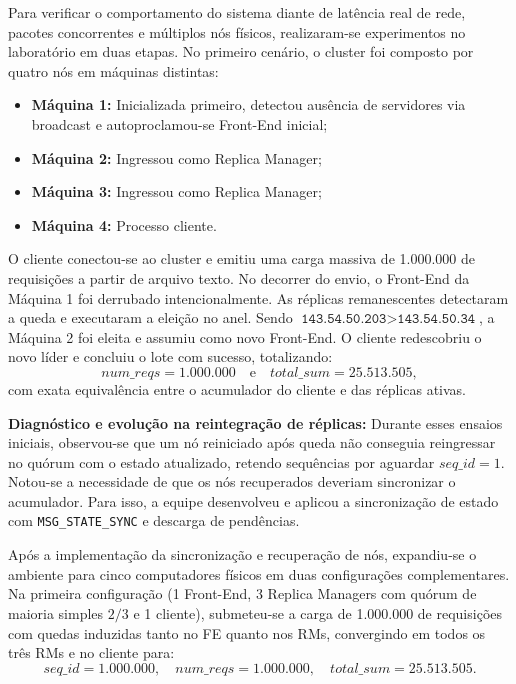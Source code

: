 \documentclass[12pt,a4paper]{article}
\newcommand{\mensagem}[1]{\texttt{#1}}
\begin{document}
Para verificar o comportamento do sistema diante de latência real de rede, pacotes concorrentes e múltiplos nós físicos, realizaram-se experimentos no laboratório em duas etapas. No primeiro cenário, o cluster foi composto por quatro nós em máquinas distintas:
\begin{itemize}
    \item \textbf{Máquina 1:} Inicializada primeiro, detectou ausência de servidores via broadcast e autoproclamou-se Front-End inicial;
    \item \textbf{Máquina 2:} Ingressou como Replica Manager;
    \item \textbf{Máquina 3:} Ingressou como Replica Manager;
    \item \textbf{Máquina 4:} Processo cliente.
\end{itemize}

O cliente conectou-se ao cluster e emitiu uma carga massiva de 1.000.000 de requisições a partir de arquivo texto. No decorrer do envio, o Front-End da Máquina 1 foi derrubado intencionalmente. As réplicas remanescentes detectaram a queda e executaram a eleição no anel. Sendo $\texttt{143.54.50.203} > \texttt{143.54.50.34}$, a Máquina 2 foi eleita e assumiu como novo Front-End. O cliente redescobriu o novo líder e concluiu o lote com sucesso, totalizando:
\[
    num\_reqs = 1.000.000 \quad \text{e} \quad total\_sum = 25.513.505,
\]
com exata equivalência entre o acumulador do cliente e das réplicas ativas.

\noindent\textbf{Diagnóstico e evolução na reintegração de réplicas:} Durante esses ensaios iniciais, observou-se que um nó reiniciado após queda não conseguia reingressar no quórum com o estado atualizado, retendo sequências por aguardar $seq\_id=1$. Notou-se a necessidade de que os nós recuperados deveriam sincronizar o acumulador. Para isso, a equipe desenvolveu e aplicou a sincronização de estado com \mensagem{MSG\_STATE\_SYNC} e descarga de pendências.

Após a implementação da sincronização e recuperação de nós, expandiu-se o ambiente para cinco computadores físicos em duas configurações complementares. Na primeira configuração (1 Front-End, 3 Replica Managers com quórum de maioria simples $2/3$ e 1 cliente), submeteu-se a carga de 1.000.000 de requisições com quedas induzidas tanto no FE quanto nos RMs, convergindo em todos os três RMs e no cliente para:
\[
    seq\_id = 1.000.000, \quad num\_reqs = 1.000.000, \quad total\_sum = 25.513.505.
\]
\end{document}
